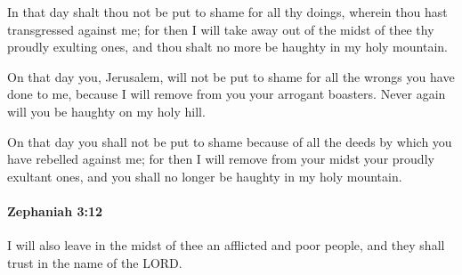 			\begin{versebox}
					\item[BHS] 
					\item[LXX] 
					\item[ASV] In that day shalt thou not be put to shame for all thy doings, wherein thou hast transgressed against me; for then I will take away out of the midst of thee thy proudly exulting ones, and thou shalt no more be haughty in my holy mountain.
					\item[NIV] On that day you, Jerusalem, will not be put to shame for all the wrongs you have done to me, because I will remove from you your arrogant boasters. Never again will you be haughty on my holy hill.
					\item[NRSV] On that day you shall not be put to shame because of all the deeds by which you have rebelled against me; for then I will remove from your midst your proudly exultant ones, and you shall no longer be haughty in my holy mountain.
			\end{versebox}

		\paragraph{Zephaniah 3:12} %
			\label{ZEPHANIAH-3-12}

			I will also leave in the midst of thee an afflicted and poor people, and they shall trust in the name of the LORD.

